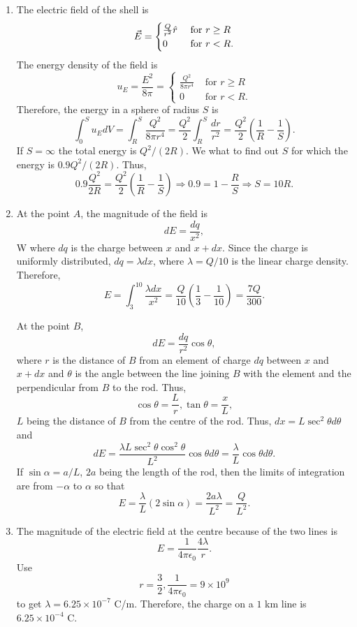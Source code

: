 \documentclass{article}
\begin{document}
\begin{enumerate}
\item The electric field of the shell is
\[
\vec{E} = \begin{cases}
\frac{Q}{r^2}\hat{r} & \text{ for } r \ge R \\
0 & \text{ for } r < R.
\end{cases}
\]
The energy density of the field is 
\[
u_E = \frac{E^2}{8\pi} = \begin{cases} \frac{Q^2}{8\pi r^4} & \text{ for } r \ge R \\
0 & \text{ for } r < R.
\end{cases}
\]
Therefore, the energy in a sphere of radius $S$ is
\[
\int_0^S u_EdV = \int_R^S \frac{Q^2}{8\pi r^4} = \frac{Q^2}{2}\int_R^S\frac{dr}{r^2}
= \frac{Q^2}{2}\left(\frac{1}{R} - \frac{1}{S}\right).
\]
If $S = \infty$ the total energy is $Q^2/(2R)$. We what to find out $S$ for 
which the energy is $0.9Q^2/(2R)$. Thus,
\[
0.9\frac{Q^2}{2R} = \frac{Q^2}{2}\left(\frac{1}{R} - \frac{1}{S}\right)
\Rightarrow 0.9 = 1 - \frac{R}{S} \Rightarrow S = 10R.
\]

\item At the point $A$, the magnitude of the field is
\[
dE = \frac{dq}{x^2},
\] W
where $dq$ is the charge between $x$ and $x + dx$. Since the charge is uniformly
distributed, $dq = \lambda dx$, where $\lambda = Q/10$ is the linear charge density.
Therefore,
\[
E = \int_3^{10}\frac{\lambda dx}{x^2} = \frac{Q}{10}\left(\frac{1}{3} - \frac{1}{10}\right)
= \frac{7Q}{300}.
\]

At the point $B$,
\[
dE = \frac{dq}{r^2}\cos\theta,
\]
where $r$ is the distance of $B$ from an element of charge $dq$ between $x$ and
$x + dx$ and $\theta$ is the angle between the line joining $B$ with the element
and the perpendicular from $B$ to the rod. Thus,
\[
\cos\theta = \frac{L}{r}, \tan\theta = \frac{x}{L},
\]
$L$ being the distance of $B$ from the centre of the rod. Thus, $dx = L\sec^2\theta
d\theta$ and
\[
dE = \frac{\lambda L \sec^2\theta \cos^2\theta}{L^2}\cos\theta d\theta =
\frac{\lambda}{L}\cos\theta d\theta.
\]
If $\sin\alpha = a/L$, $2a$ being the length of the rod, then the limits of 
integration are from $-\alpha$ to $\alpha$ so that
\[
E = \frac{\lambda}{L}(2\sin\alpha) = \frac{2a\lambda}{L^2} = \frac{Q}{L^2}.
\]

\item The magnitude of the electric field at the centre because of the two lines
is
\[
E = \frac{1}{4\pi\epsilon_0}\frac{4\lambda}{r}.
\]
Use 
\[
r = \frac{3}{2}, \frac{1}{4\pi\epsilon_0} = 9 \times 10^9
\]
to get $\lambda = 6.25 \times 10^{-7}$ C/m. Therefore, the charge on a $1$ km
line is $6.25 \times 10^{-4}$ C.


\end{enumerate}
\end{document}
